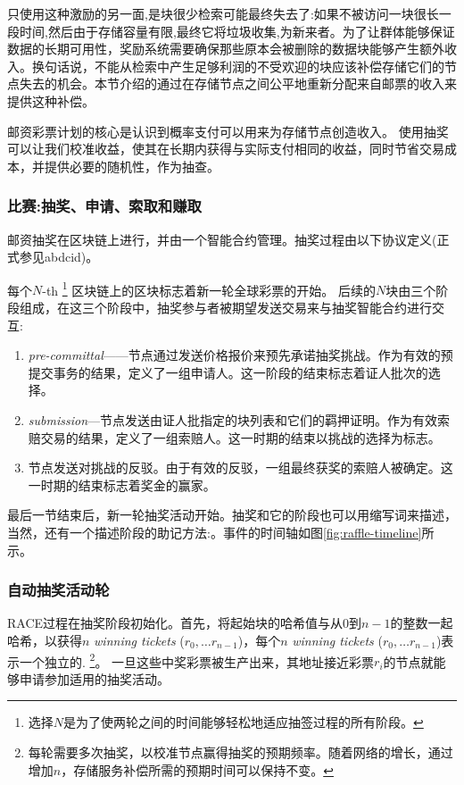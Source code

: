 只使用这种激励的另一面,是块很少检索可能最终失去了:如果不被访问一块很长一段时间,然后由于存储容量有限,最终它将垃圾收集,为新来者。为了让群体能够保证数据的长期可用性，奖励系统需要确保那些原本会被删除的数据块能够产生额外收入。换句话说，不能从检索中产生足够利润的不受欢迎的块应该补偿存储它们的节点失去的机会。本节介绍的通过在存储节点之间公平地重新分配来自邮票的收入来提供这种补偿。



邮资彩票计划的核心是认识到概率支付可以用来为存储节点创造收入。
使用抽奖可以让我们校准收益，使其在长期内获得与实际支付相同的收益，同时节省交易成本，并提供必要的随机性，作为抽查。


\subsubsection{比赛:抽奖、申请、索取和赚取}

邮资抽奖在区块链上进行，并由一个智能合约管理。抽奖过程由以下协议定义(正式参见abdcid)。

每个$N$-th %
%
\footnote{选择$N$是为了使两轮之间的时间能够轻松地适应抽签过程的所有阶段。}
%
区块链上的区块标志着新一轮全球彩票的开始。
后续的$N$块由三个阶段组成，在这三个阶段中，抽奖参与者被期望发送交易来与抽奖智能合约进行交互: 

\begin{enumerate}
\item \emph{pre-committal}——节点通过发送价格报价来预先承诺抽奖挑战。作为有效的预提交事务的结果，定义了一组申请人。这一阶段的结束标志着证人批次的选择。
\item \emph{submission}—节点发送由证人批指定的块列表和它们的羁押证明。作为有效索赔交易的结果，定义了一组索赔人。这一时期的结束以挑战的选择为标志。
\item 节点发送对挑战的反驳。由于有效的反驳，一组最终获奖的索赔人被确定。这一时期的结束标志着奖金的赢家。
\end{enumerate}

最后一节结束后，新一轮抽奖活动开始。抽奖和它的阶段也可以用缩写词来描述，当然，还有一个描述阶段的助记方法:。事件的时间轴如图\ref{fig:raffle-timeline}所示。


\subsubsection{自动抽奖活动轮}

RACE过程在抽奖阶段初始化。首先，将起始块的哈希值与从$0$到$n-1$的整数一起哈希，以获得$n$ \emph{winning tickets} ($r_0, \ldots r_{n-1}$)，每个$n$ \emph{winning tickets} ($r_0, \ldots r_{n-1}$)表示一个独立的.%
%
\footnote{每轮需要多次抽奖，以校准节点赢得抽奖的预期频率。随着网络的增长，通过增加$n$，存储服务补偿所需的预期时间可以保持不变。}。 
%
一旦这些中奖彩票被生产出来，其地址接近彩票$r_i$的节点就能够申请参加适用的抽奖活动。


